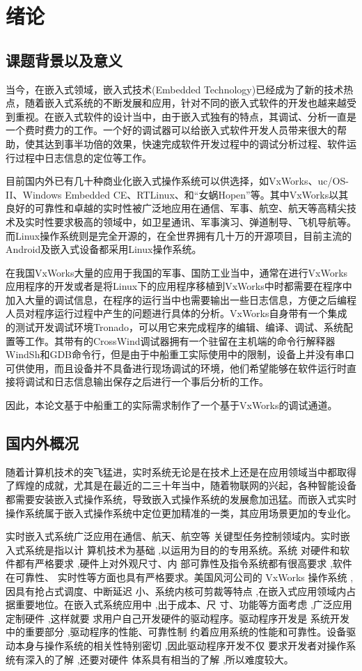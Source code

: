 \chapter{绪论}
\section{课题背景以及意义}
	当今，在嵌入式领域，嵌入式技术(Embedded Technology)已经成为了新的技术热点，随着嵌入式系统的不断发展和应用，针对不同的嵌入式软件的开发也越来越受到重视。在嵌入式软件的设计当中，由于嵌入式独有的特点，其调试、分析一直是一个费时费力的工作。一个好的调试器可以给嵌入式软件开发人员带来很大的帮助，使其达到事半功倍的效果，快速完成软件开发过程中的调试分析过程、软件运行过程中日志信息的定位等工作。
		
	目前国内外已有几十种商业化嵌入式操作系统可以供选择，如VxWorks、uc/OS-II、Windows Embedded CE、RTLinux、和“女蜗Hopen”等。其中VxWorks以其良好的可靠性和卓越的实时性被广泛地应用在通信、军事、航空、航天等高精尖技术及实时性要求极高的领域中，如卫星通讯、军事演习、弹道制导、飞机导航等。而Linux操作系统则是完全开源的，在全世界拥有几十万的开源项目，目前主流的Android及嵌入式设备都采用Linux操作系统。
	
	在我国VxWorks大量的应用于我国的军事、国防工业当中，通常在进行VxWorks应用程序的开发或者是将Linux下的应用程序移植到VxWorks中时都需要在程序中加入大量的调试信息，在程序的运行当中也需要输出一些日志信息，方便之后编程人员对程序运行过程中产生的问题进行具体的分析。VxWorks自身带有一个集成的测试开发调试环境Tronado，可以用它来完成程序的编辑、编译、调试、系统配置等工作。其带有的CrossWind调试器拥有一个驻留在主机端的命令行解释器WindSh和GDB命令行，但是由于中船重工实际使用中的限制，设备上并没有串口可供使用，而且设备并不具备进行现场调试的环境，他们希望能够在软件运行时直接将调试和日志信息输出保存之后进行一个事后分析的工作。
	
	因此，本论文基于中船重工的实际需求制作了一个基于VxWorks的调试通道。
	
			
\section{国内外概况}
	随着计算机技术的突飞猛进，实时系统无论是在技术上还是在应用领域当中都取得了辉煌的成就，尤其是在最近的二三十年当中，随着物联网的兴起，各种智能设备都需要安装嵌入式操作系统，导致嵌入式操作系统的发展愈加迅猛。而嵌入式实时操作系统属于嵌入式操作系统中定位更加精准的一类，其应用场景更加的专业化。

实时嵌入式系统广泛应用在通信、航天、航空等
关键型任务控制领域内。实时嵌入式系统是指以计
算机技术为基础 ,以运用为目的的专用系统。系统
对硬件和软件都有严格要求 ,硬件上对外观尺寸、内
部可靠性及指令系统都有很高要求 ,软件在可靠性、
实时性等方面也具有严格要求。美国风河公司的
VxWorks 操作系统 ,因具有抢占式调度、中断延迟
小、系统内核可剪裁等特点 ,在嵌入式应用领域内占
据重要地位。在嵌入式系统应用中 ,出于成本、尺
寸、功能等方面考虑 ,广泛应用定制硬件 ,这样就要
求用户自己开发硬件的驱动程序。驱动程序开发是
系统开发中的重要部分 ,驱动程序的性能、可靠性制
约着应用系统的性能和可靠性。设备驱动本身与操作系统的相关性特别密切 ,因此驱动程序开发不仅
要求开发者对操作系统有深入的了解 ,还要对硬件
体系具有相当的了解 ,所以难度较大。
	
